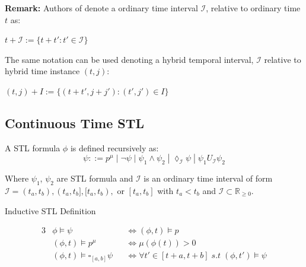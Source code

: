\documentclass{article}
\theoremstyle{definition}
\newtheorem{definition}{Definition}[section]
\begin{document}
    





\clearpage
\begin{flushleft}
\textbf{Remark:}
Authors of \cite{hutchison_robust_2010} denote a ordinary time interval $\mathcal{I}$, relative to ordinary time $t$ as: 
\end{flushleft}

\begin{center}
$t + \mathcal{I} := \{t+t': t' \in \mathcal{I}\}$ 
\end{center}
The same notation can be used denoting a hybrid temporal interval, $\mathcal{I}$ relative to hybrid time instance $(t,j)$:
\begin{center}
    $(t,j) + I := \{(t+t',j+j'): (t',j') \in I\}$
\end{center}


\clearpage
\subsection{Continuous Time STL}
A STL formula $\phi$ is defined recursively as:
\begin{equation}
    \psi ::= p^\mu\;|\;\lnot \psi\;|\;\psi_1 \land \psi_2\;|\;\lozenge_{\mathcal{I}} \psi\;|\;\psi_1 U_{\mathcal{I}} \psi_2
\end{equation}


Where $\psi_1$, $\psi_2$ are STL formula and $\mathcal{I}$ is an ordinary time interval of form $\mathcal{I} = (t_a,t_b),(t_a,t_b],[t_a,t_b),$ or $[t_a,t_b]$ with $t_a < t_b$ and $\mathcal{I} \subset \mathbb{R}_{\geq 0}$.

\begin{center}
    Inductive STL Definition
\end{center}
\begin{alignat*}{3}
            &\phi \models \psi &&\Leftrightarrow (\phi, t) \models p \\
            &(\phi, t) \models p^\mu \quad &&\Leftrightarrow \mu(\phi(t))
> 0\\
            &(\phi, t) \models \square_{[a,b]} \psi &&\Leftrightarrow
\forall t' \in [t + a, t + b]\;s.t\;(\phi, t') \models \psi
\end{alignat*}

\end{document}

